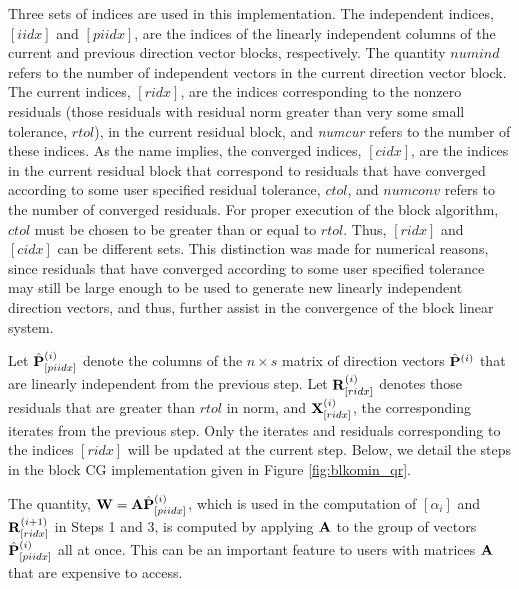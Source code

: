 \documentclass[twoside]{siamltex}
\newcommand{\bA}{{\bf A}}
\newcommand{\bP}{{\bf P}}
\newcommand{\bW}{{\bf W}}
\newcommand{\bR}{{\bf R}}
\newcommand{\bX}{{\bf X}}
\begin{document}
Three sets of indices are used in this implementation. The
independent indices, $[iidx]$ and $[piidx]$, are the indices of
the linearly independent columns of the current and previous
direction vector blocks, respectively. The quantity $numind$
refers to the number of independent vectors in the current
direction vector block. The current indices, $[ridx]$, are the
indices corresponding to the nonzero residuals (those residuals
with residual norm greater than very some small tolerance,
$rtol$), in the current residual block, and {\it numcur} refers to
the number of these indices.  As the name implies, the converged
indices, $[cidx]$, are the indices in the current residual block
that correspond to residuals that have converged according to some
user specified residual tolerance, $ctol$, and $numconv$ refers to
the number of converged residuals. For proper execution of the
block algorithm, $ctol$ must be chosen to be greater than or equal
to $rtol$. Thus, $[ridx]$ and $[cidx]$ can be different sets. This
distinction was made for numerical reasons, since residuals that
have converged according to some user specified tolerance may
still be large enough to be used to generate new linearly
independent direction vectors, and thus, further assist in the
convergence of the block linear system.

Let ${\hat \bP}^{(i)}_{[piidx]}$ denote the columns of the $n
\times s$ matrix of direction vectors ${\hat \bP}^{(i)}$ that are
linearly independent from the previous step. Let
$\bR^{(i)}_{[ridx]}$ denotes those residuals that are greater than
$rtol$ in norm, and $\bX_{[ridx]}^{(i)}$, the corresponding
iterates from the previous step. Only the iterates and residuals
corresponding to the indices $[ridx]$ will be updated at the
current step. Below, we detail the steps in the block CG
implementation given in Figure \ref{fig:blkomin_qr}.

The quantity, $\bW = \bA {\hat \bP}_{[piidx]}^{(i)}$, which is
used in the computation of $[\alpha_i]$ and $\bR_{[ridx]}^{(i+1)}$
in Steps 1 and 3, is computed by applying $\bA$ to the group of
vectors ${\hat \bP}_{[piidx]}^{(i)}$ all at once. This can be an
important feature to users with matrices $\bA$ that are expensive
to access.
\end{document}
